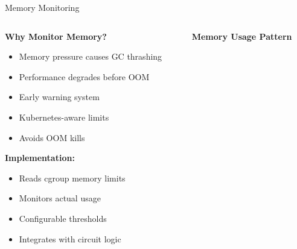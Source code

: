 \documentclass[aspectratio=169]{beamer}
\begin{document}
\begin{frame}{Memory Monitoring}
    \begin{columns}
        \begin{column}{0.5\textwidth}
            \textbf{Why Monitor Memory?}
            \begin{itemize}
                \item Memory pressure causes GC thrashing
                \item Performance degrades before OOM
                \item Early warning system
                \item Kubernetes-aware limits
             \item Avoids OOM kills
            \end{itemize}
            
            \vspace{0.3cm}
            \textbf{Implementation:}
            \begin{itemize}
                \item Reads cgroup memory limits
                \item Monitors actual usage
                \item Configurable thresholds
                \item Integrates with circuit logic
            \end{itemize}
        \end{column}
        \begin{column}{0.5\textwidth}
            \begin{center}
                \textbf{Memory Usage Pattern}
            \end{center}
        \end{column}
    \end{columns}
\end{frame}
\end{document}

